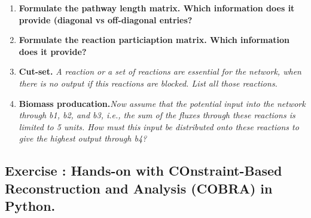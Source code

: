 \documentclass[10pt,a4paper]{article}
\newcommand{\exercise}[1]
{
  \stepcounter{subsection}
  \subsection*{Exercise \thesubsection: #1}

}
\begin{document}
\begin{enumerate}
\item \textbf{Formulate the pathway length matrix. Which information does it provide (diagonal vs off-diagonal entries?}\\

\item \textbf{Formulate the reaction particiaption matrix. Which information does it provide?}\\

\item \textbf{Cut-set.} \textit{A reaction or a set of reactions are essential for the network, when there is no output if this reactions are blocked. List all those reactions.}\\

\item \textbf{Biomass producation.}\textit{Now assume that the potential input into the network through b1, b2, and b3, i.e., the sum of the fluxes through these reactions is limited to 5 units. How must this input be distributed onto these reactions to give the highest output through b4?}\\





\end{enumerate}






\newpage
\exercise{Hands-on with COnstraint-Based Reconstruction and Analysis (COBRA) in Python.}
\end{document}
